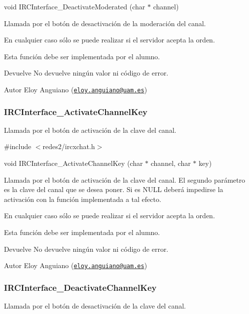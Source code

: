 void I\-R\-C\-Interface\-\_\-\-Deactivate\-Moderated (char $\ast$ channel)

Llamada por el botón de desactivación de la moderación del canal.

En cualquier caso sólo se puede realizar si el servidor acepta la orden.

Esta función debe ser implementada por el alumno.

\begin{DoxyReturn}{Devuelve}
No devuelve ningún valor ni código de error.
\end{DoxyReturn}
\begin{DoxyAuthor}{Autor}
Eloy Anguiano (\href{mailto:eloy.anguiano@uam.es}{\tt eloy.\-anguiano@uam.\-es})
\end{DoxyAuthor}


 \hypertarget{IRCInterface_ActivateChannelKey}{}\subsubsection{I\-R\-C\-Interface\-\_\-\-Activate\-Channel\-Key}\label{IRCInterface_ActivateChannelKey}
Llamada por el botón de activación de la clave del canal.

\#include $<$redes2/ircxchat.\-h$>$

void I\-R\-C\-Interface\-\_\-\-Activate\-Channel\-Key (char $\ast$ channel, char $\ast$ key)

Llamada por el botón de activación de la clave del canal. El segundo parámetro es la clave del canal que se desea poner. Si es N\-U\-L\-L deberá impedirse la activación con la función implementada a tal efecto.

En cualquier caso sólo se puede realizar si el servidor acepta la orden.

Esta función debe ser implementada por el alumno.

\begin{DoxyReturn}{Devuelve}
No devuelve ningún valor ni código de error.
\end{DoxyReturn}
\begin{DoxyAuthor}{Autor}
Eloy Anguiano (\href{mailto:eloy.anguiano@uam.es}{\tt eloy.\-anguiano@uam.\-es})
\end{DoxyAuthor}


 \hypertarget{IRCInterface_DeactivateChannelKey}{}\subsubsection{I\-R\-C\-Interface\-\_\-\-Deactivate\-Channel\-Key}\label{IRCInterface_DeactivateChannelKey}
Llamada por el botón de desactivación de la clave del canal.


